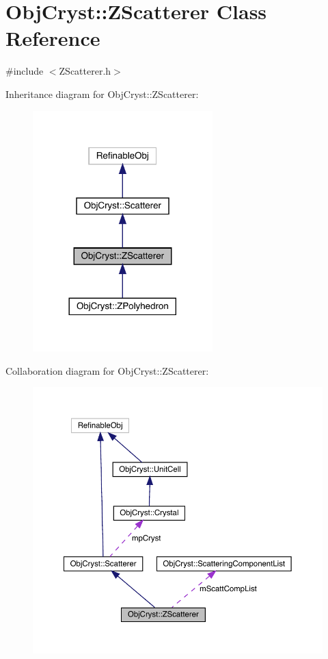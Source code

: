 \hypertarget{class_obj_cryst_1_1_z_scatterer}{}\section{Obj\+Cryst\+::Z\+Scatterer Class Reference}
\label{class_obj_cryst_1_1_z_scatterer}


{\ttfamily \#include $<$Z\+Scatterer.\+h$>$}



Inheritance diagram for Obj\+Cryst\+::Z\+Scatterer\+:
\nopagebreak
\begin{figure}[H]
\begin{center}
\leavevmode
\includegraphics[width=197pt]{class_obj_cryst_1_1_z_scatterer__inherit__graph}
\end{center}
\end{figure}


Collaboration diagram for Obj\+Cryst\+::Z\+Scatterer\+:
\nopagebreak
\begin{figure}[H]
\begin{center}
\leavevmode
\includegraphics[width=350pt]{class_obj_cryst_1_1_z_scatterer__coll__graph}
\end{center}
\end{figure}

